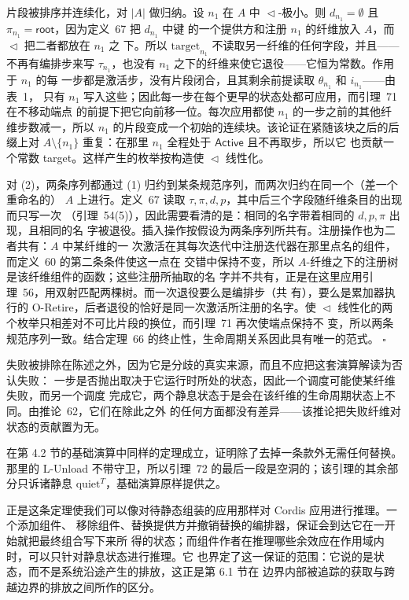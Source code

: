 片段被排序并连续化，对 \(|A|\) 做归纳。设 \(n_{1}\) 在 \(A\) 中 \(\vartriangleleft\)-极小。则
\(d_{n_{1}} = \emptyset\) 且 \(\pi_{n_{1}} = \mathsf{root}\)，因为定义~67 把 \(d_{n_{1}}\) 中键
的一个提供方和注册 \(n_{1}\) 的纤维放入 \(A\)，而 \(\vartriangleleft\) 把二者都放在 \(n_{1}\) 之
下。所以 \(\mathrm{target}_{n_{1}}\) 不读取另一纤维的任何字段，并且——不再有编排步来写
\(\tau_{n_{1}}\)，也没有 \(n_{1}\) 之下的纤维来使它退役——它恒为常数。作用于 \(n_{1}\) 的每
一步都是激活步，没有片段闭合，且其剩余前提读取 \(\theta_{n_{1}}\) 和 \(i_{n_{1}}\)——由表~1，
只有 \(n_{1}\) 写入这些；因此每一步在每个更早的状态处都可应用，而引理~71 在不移动端点
的前提下把它向前移一位。每次应用都使 \(n_{1}\) 的一步之前的其他纤维步数减一，所以
\(n_{1}\) 的片段变成一个初始的连续块。该论证在紧随该块之后的后缀上对
\(A \setminus \{n_{1}\}\) 重复：在那里 \(n_{1}\) 全程处于 \(\mathsf{Active}\) 且不再取步，所以它
也贡献一个常数 target。这样产生的枚举按构造使 \(\vartriangleleft\) 线性化。

对 (2)，两条序列都通过 (1) 归约到某条规范序列，而两次归约在同一个（差一个重命名的）
\(A\) 上进行。定义~67 读取 \(\tau, \pi, d, p\)，其中后三个字段随纤维条目的出现而只写一次
（引理~54(5)），因此需要看清的是：相同的名字带着相同的 \(d, p, \pi\) 出现，且相同的名
字被退役。插入操作按假设为两条序列所共有。注册操作也为二者共有：\(A\) 中某纤维的一
次激活在其每次迭代中注册迭代器在那里点名的组件，而定义~60 的第二条条件使这一点在
交错中保持不变，所以 \(A\)-纤维之下的注册树是该纤维组件的函数；这些注册所抽取的名
字并不共有，正是在这里应用引理~56，用双射匹配两棵树。而一次退役要么是编排步（共
有），要么是累加器执行的 O-Retire，后者退役的恰好是同一次激活所注册的名字。使
\(\vartriangleleft\) 线性化的两个枚举只相差对不可比片段的换位，而引理~71 再次使端点保持不
变，所以两条规范序列一致。结合定理~66 的终止性，生命周期关系因此具有唯一的范式。
\(\square\)

失败被排除在陈述之外，因为它是分歧的真实来源，而且不应把这套演算解读为否认失败：
一步是否抛出取决于它运行时所处的状态，因此一个调度可能使某纤维失败，而另一个调度
完成它，两个静息状态于是会在该纤维的生命周期状态上不同。由推论~62，它们在除此之外
的任何方面都没有差异——该推论把失败纤维对状态的贡献置为无。

在第 4.2 节的基础演算中同样的定理成立，证明除了去掉一条款外无需任何替换。那里的
L-Unload 不带守卫，所以引理~72 的最后一段是空洞的；该引理的其余部分只诉诸静息
\(\mathrm{quiet}^{T}\)，基础演算原样提供之。

正是这条定理使我们可以像对待静态组装的应用那样对 Cordis 应用进行推理。一个添加组件、
移除组件、替换提供方并撤销替换的编排器，保证会到达它在一开始就把最终组合写下来所
得的状态；而组件作者在推理哪些余效应在作用域内时，可以只针对静息状态进行推理。它
也界定了这一保证的范围：它说的是状态，而不是系统沿途产生的排放，这正是第 6.1 节在
边界内部被追踪的获取与跨越边界的排放之间所作的区分。
